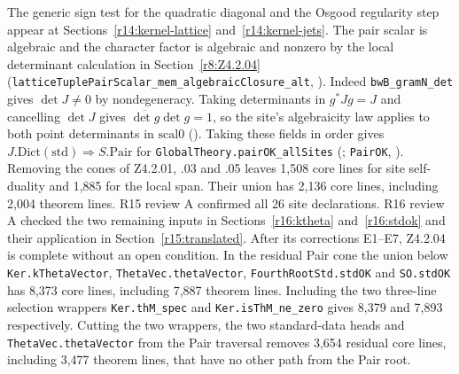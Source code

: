 The generic sign test for the quadratic diagonal and the Osgood
regularity step appear at Sections~\ref{r14:kernel-lattice}
and~\ref{r14:kernel-jets}. The pair scalar is algebraic and the character
factor is algebraic and nonzero by the local determinant calculation in
Section~\ref{r8:Z4.2.04} (\nolinkurl{latticeTuplePairScalar_mem_algebraicClosure_alt},
).
Indeed \nolinkurl{bwB_gramN_det} gives $\det J\ne0$ by
nondegeneracy. Taking determinants in $g^*Jg=J$ and cancelling
$\det J$ gives $\overline{\det g}\det g=1$, so the site's algebraicity
law applies to both point determinants in $\mathrm{scal0}$
().
Taking these fields in order gives
$J.\mathrm{Dict}(\mathrm{std})\Longrightarrow S.\mathrm{Pair}$ for
\nolinkurl{GlobalTheory.pairOK_allSites}
(;
\nolinkurl{PairOK}, ).
Removing the cones of Z4.2.01, .03 and .05 leaves 1,508 core
lines for site self-duality and 1,885 for the local span. Their union
has 2,136 core lines, including 2,004 theorem lines.
R15 review A confirmed all 26 site declarations. R16 review A checked
the two remaining inputs in Sections~\ref{r16:ktheta} and~\ref{r16:stdok}
and their application in Section~\ref{r15:translated}. After its
corrections E1--E7, Z4.2.04 is complete without an open condition.
In the residual Pair cone the union below \nolinkurl{Ker.kThetaVector},
\nolinkurl{ThetaVec.thetaVector}, \nolinkurl{FourthRootStd.stdOK}
and \nolinkurl{SO.stdOK} has 8,373 core lines, including 7,887
theorem lines. Including the two three-line selection wrappers
\nolinkurl{Ker.thM_spec} and \nolinkurl{Ker.isThM_ne_zero} gives
8,379 and 7,893 respectively. Cutting the two wrappers, the two
standard-data heads and \nolinkurl{ThetaVec.thetaVector} from the
Pair traversal removes 3,654 residual core lines, including 3,477
theorem lines, that have no other path from the Pair root.

